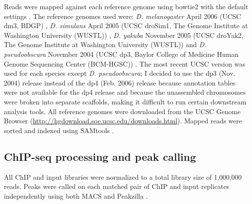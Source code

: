 Reads were mapped against each reference genome using bowtie2 with the default settings \citep{langmead_fast_2012}. The reference genomes used were: \emph{D. melanogaster} April 2006 (UCSC dm3, BDGP) \citep{adams_genome_2000, celniker_finishing_2002}, \emph{D. simulans} April 2005 (UCSC droSim1, The Genome Institute at Washington University (WUSTL)) \citep{clark_evolution_2007}, \emph{D. yakuba} November 2005 (UCSC droYak2, The Genome Institute at Washington University (WUSTL)) \citep{clark_evolution_2007} and \emph{D. pseudoobscura} November 2004 (UCSC dp3, Baylor College of Medicine Human Genome Sequencing Center (BCM-HGSC)) \citep{clark_evolution_2007, richards_comparative_2005}. The most recent UCSC version was used for each species except \emph{D. pseudoobscura}; I decided to use the dp3 (Nov. 2004) release instead of the dp4 (Feb. 2006) release because annotation tables were not available for the dp4 release and because the unassembled chromosomes were broken into separate scaffolds, making it difficult to run certain downstream analysis tools. All reference genomes were downloaded from the UCSC Genome Browser (\url{http://hgdownload.soe.ucsc.edu/downloads.html}). Mapped reads were sorted and indexed using SAMtools \citep{li_sequence_2009}.

\subsection{ChIP-seq processing and peak calling}
All ChIP and input libraries were normalized to a total library size of 1,000,000 reads. Peaks were called on each matched pair of ChIP and input replicates independently using both MACS and Peakzilla \citep{bardet_identification_2013, zhang_model-based_2008}.

